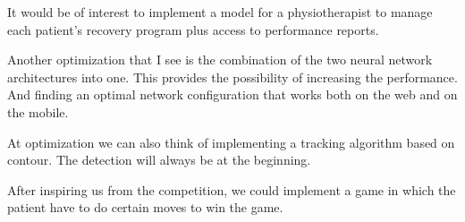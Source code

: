 It would be of interest to implement a model for a physiotherapist to manage each patient's recovery program plus access to performance reports.

Another optimization that I see is the combination of the two neural network architectures into one.
This provides the possibility of increasing the performance. And finding an optimal network configuration that works both on the web and on the mobile.

At optimization we can also think of implementing a tracking algorithm based on contour. The detection will always be at the beginning.

After inspiring us from the competition, we could implement a game in which the patient have to do  certain moves to win the game.
